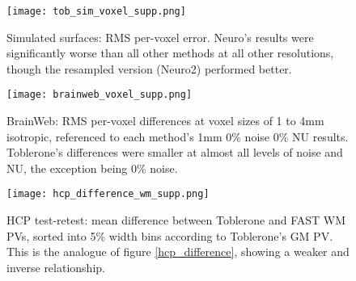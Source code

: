 \begin{appendices}
\begin{figure}
\centering
\texttt{[image: tob\_sim\_voxel\_supp.png]}
\caption{Simulated surfaces: RMS per-voxel error. Neuro’s results were significantly worse than all other methods at all other resolutions, though the resampled version (Neuro2) performed better. }
\label{tob_sim_voxel_supp}
\end{figure}

\begin{figure}
\centering
\texttt{[image: brainweb\_voxel\_supp.png]}
\caption{BrainWeb: RMS per-voxel differences at voxel sizes of 1 to 4mm isotropic, referenced to each method’s 1mm 0\% noise 0\% NU results. Toblerone’s differences were smaller at almost all levels of noise and NU, the exception being 0\% noise.  }
\label{brainweb_voxel_supp}
\end{figure}

\begin{figure}
\centering
\texttt{[image: hcp\_difference\_wm\_supp.png]}
\caption{HCP test-retest: mean difference between Toblerone and FAST WM PVs, sorted into 5\% width bins according to Toblerone’s GM PV. This is the analogue of figure \ref{hcp_difference}, showing a weaker and inverse relationship.}
\label{hcp_difference_wm_supp}
\end{figure}

\end{appendices}